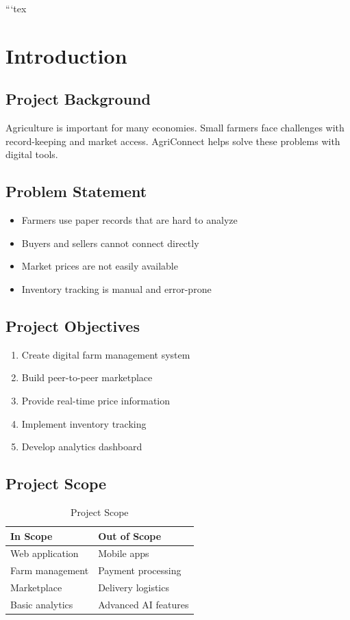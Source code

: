 ```tex
\section{Introduction}

\subsection{Project Background}
Agriculture is important for many economies. Small farmers face challenges with record-keeping and market access. AgriConnect helps solve these problems with digital tools.

\subsection{Problem Statement}
\begin{itemize}[leftmargin=*]
    \item Farmers use paper records that are hard to analyze
    \item Buyers and sellers cannot connect directly
    \item Market prices are not easily available
    \item Inventory tracking is manual and error-prone
\end{itemize}

\subsection{Project Objectives}
\begin{enumerate}[label=\arabic*., leftmargin=*]
    \item Create digital farm management system
    \item Build peer-to-peer marketplace
    \item Provide real-time price information
    \item Implement inventory tracking
    \item Develop analytics dashboard
\end{enumerate}

\subsection{Project Scope}
\begin{table}[H]
    \centering
    \begin{tabular}{|l|l|}
        \hline
        \textbf{In Scope} & \textbf{Out of Scope} \\
        \hline
        Web application & Mobile apps \\
        Farm management & Payment processing \\
        Marketplace & Delivery logistics \\
        Basic analytics & Advanced AI features \\
        \hline
    \end{tabular}
    \caption{Project Scope}
    \label{tab:scope}
\end{table}

